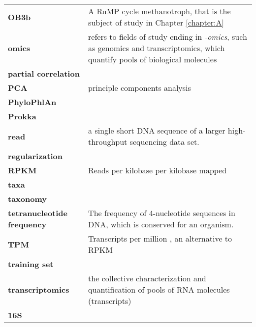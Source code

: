 \begin{singlespace}
\begin{longtable}{ p{}  p{} }
\textbf{OB3b} & A RuMP cycle methanotroph, that is the subject of study in Chapter \ref{chapter:A}  \\
\textbf{omics} & refers to fields of study ending in \textit{-omics}, such as genomics and transcriptomics, which quantify pools of biological molecules \\
\textbf{partial correlation} &  \\
\textbf{PCA} & principle components analysis \\
\textbf{PhyloPhlAn} &  \\
\textbf{Prokka} &  \\
\textbf{read} & a single short DNA sequence of a larger high-throughput sequencing data set. \\
\textbf{regularization} &  \\
\textbf{RPKM} & Reads per kilobase per kilobase mapped \cite{mortazavi2008} \\
\textbf{taxa} &  \\
\textbf{taxonomy} &  \\
\textbf{tetranucleotide frequency} & The frequency of 4-nucleotide sequences in DNA, which is conserved for an organism. \\
\textbf{TPM} & Transcripts per million \cite{wagner2012}, an alternative to RPKM \cite{mortazavi2008} \\
\textbf{training set} &  \\
\textbf{transcriptomics} & the collective characterization and quantification of pools of RNA molecules (transcripts) \\
\textbf{16S} &  \\

\end{longtable}
\end{singlespace}
